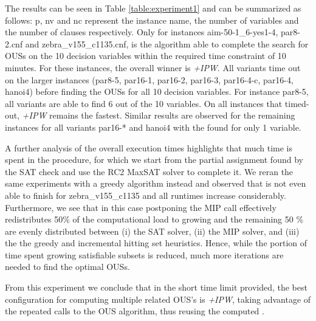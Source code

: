 {%
The results can be seen in Table \ref{table:experiment1} and can be summarized as follows: p, nv and nc represent the instance name, the number of variables and the number of clauses respectively. 
Only for instances aim-50-1\_6-yes1-4, par8-2.cnf and zebra\_v155\_c1135.cnf, is the algorithm able to complete the search for OUSs on the 10 decision variables within the required time constraint of 10 minutes.
For these instances, the overall winner is \emph{{\omus}+IPW}. 
All variants time out on the larger instances (par8-5, par16-1, par16-2, par16-3, par16-4-c, par16-4, hanoi4) before finding the OUSs for all 10 decision variables. For instance par8-5, all variants are able to find 6 out of the 10 variables. On all instances that timed-out, \emph{{\omus}+IPW} remains the fastest. Similar results are observed for the remaining instances for all variants par16-* and hanoi4 with the \omus found for only 1 variable.


A further analysis of the overall execution times highlights that much time is spent in the \grow procedure, for which we start from the partial assignment found by the SAT check and use the RC2 MaxSAT solver to complete it. 
We reran the same experiments with a greedy \grow algorithm instead and observed that \omus is not even able to finish for zebra\_v155\_c1135 and all runtimes increase considerably.
Furthermore, we see that in this case postponing the MIP call effectively redistributes 50\% of the computational load to growing \satsets and the remaining 50 \% are evenly distributed between (i) the SAT solver, (ii) the MIP solver, and (iii) the the greedy and incremental hitting set heuristics. Hence, while the portion of time spent growing satisfiable subsets is reduced, much more iterations are needed to find the optimal OUSs. %

From this experiment we conclude that in the short time limit provided, the best configuration for computing multiple related OUS's is \emph{{\omus}+IPW}, taking advantage of the repeated calls to the OUS algorithm, thus reusing the computed \satsets.

}
